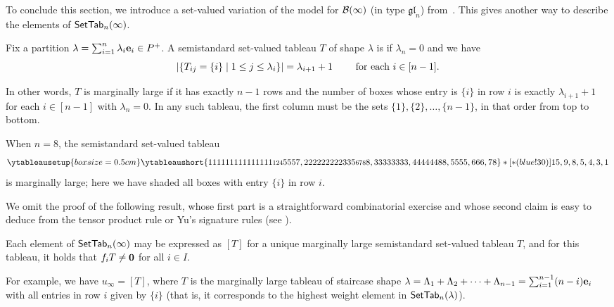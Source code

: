 \documentclass[11pt]{article}
\begin{document}
To conclude this section, we introduce a set-valued variation of the  model for $\mathcal{B}(\infty)$ (in type $\mathfrak{gl}_n$) from~\cite{Cliff98,HL08}.
This gives another way to describe the elements of $\mathsf{SetTab}_n(\infty)$.

\begin{definition}
\label{def:marginally_large}
Fix a partition $\lambda = \sum_{i=1}^n \lambda_i \textbf{e}_i \in P^+$.
A semistandard set-valued tableau $T$ of shape $\lambda$ is  if $\lambda_n = 0$ and we have
\[
\lvert  \{T_{ij} = \{i\} \mid 1 \leq j \leq \lambda_i\}  \rvert = \lambda_{i+1} + 1
\qquad \text{ for each $i \in [n-1]$}.
\]
\end{definition}

In other words, $T$ is marginally large if it has exactly $n-1$ rows and the number of boxes whose entry is $\{i\}$ in row $i$ is exactly $\lambda_{i+1} + 1$ for each $i \in [n-1]$ with $\lambda_n = 0$.
In any such tableau, the first column must be the sets $\{1\}, \{2\}, \dotsc, \{n-1\}$, in that order from top to bottom.

\begin{example}
When $n=8$,  the semistandard set-valued tableau
\[
\ytableausetup{boxsize=0.5cm}
\ytableaushort{111111111111111{\scalebox{.8}{124}}55{57},222222222335{\scalebox{.8}{678}}8,33333333,44444{48}8,5555,666,78} *[*(blue!30)]{15,9,8,5,4,3,1}
\]
is marginally large; here we have shaded all boxes with entry $\{i\}$ in row $i$.
\end{example}

We omit the proof of the following result, whose first part is a straightforward combinatorial exercise and whose second claim is easy to deduce from the tensor product rule or Yu's signature rules (see \cite[\S2.2]{MTY}).

\begin{proposition}\label{mala-lem}
Each element of $\mathsf{SetTab}_n(\infty)$ may be expressed as $[T]$ for a unique marginally large semistandard set-valued tableau $T$, and for this tableau, it holds that $f_iT \neq \boldsymbol{0}$ for all $i \in I$.
\end{proposition}

For example, we have $u_{\infty} = [T]$, where $T$ is the marginally large tableau of staircase shape $\lambda = \Lambda_1 + \Lambda_2 + \cdots + \Lambda_{n-1} = \sum_{i=1}^{n-1} (n-i) \textbf{e}_i$ with all entries in row $i$ given by $\{i\}$ (that is, it corresponds to the highest weight element in $\mathsf{SetTab}_n(\lambda)$).
\end{document}
